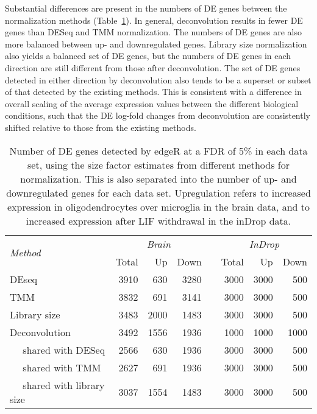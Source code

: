 \documentclass{article}
\begin{document}
Substantial differences are present in the numbers of DE genes between the normalization methods (Table~\ref{tab:real_de}).
In general, deconvolution results in fewer DE genes than DESeq and TMM normalization.
The numbers of DE genes are also more balanced between up- and downregulated genes.
Library size normalization also yields a balanced set of DE genes, but the numbers of DE genes in each direction are still different from those after deconvolution.
The set of DE genes detected in either direction by deconvolution also tends to be a superset or subset of that detected by the existing methods.
This is consistent with a difference in overall scaling of the average expression values between the different biological conditions, 
    such that the DE log-fold changes from deconvolution are consistently shifted relative to those from the existing methods.

\begin{table}[bt]
\caption{
    Number of DE genes detected by edgeR at a FDR of 5\% in each data set, using the size factor estimates from different methods for normalization.
    This is also separated into the number of up- and downregulated genes for each data set.
    Upregulation refers to increased expression in oligodendrocytes over microglia in the brain data, and to increased expression after LIF withdrawal in the inDrop data.
}
\begin{center}
\begin{tabular}{l r r r c r r r}
\hline
\multirow{2}{*}{\textit{Method}} & \multicolumn{3}{c}{\textit{Brain}} && \multicolumn{3}{c}{\textit{InDrop}}  \\
\cline{2-4}
\cline{6-8}
& Total & Up & Down && Total & Up & Down \\
\hline
DEseq                               & 3910 & 630  & 3280 && 3000 & 3000 & 500 \\
TMM                                 & 3832 & 691  & 3141 && 3000 & 3000 & 500 \\
Library size                        & 3483 & 2000 & 1483 && 3000 & 3000 & 500 \\
Deconvolution                       & 3492 & 1556 & 1936 && 1000 & 1000 & 1000 \\
$\quad$ shared with DESeq           & 2566 & 630  & 1936 && 3000 & 3000 & 500 \\
$\quad$ shared with TMM             & 2627 & 691  & 1936 && 3000 & 3000 & 500 \\
$\quad$ shared with library size    & 3037 & 1554 & 1483 && 3000 & 3000 & 500 \\
\hline                                                   
\end{tabular}
\end{center}
\label{tab:real_de}
\end{table}
\end{document}

